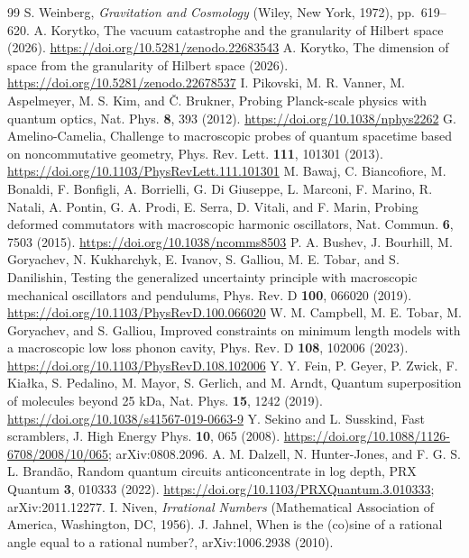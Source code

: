 \documentclass[aps,prd,twocolumn,superscriptaddress,nofootinbib]{revtex4-2}
\begin{document}
\begin{thebibliography}{99}
 S. Weinberg, \emph{Gravitation and Cosmology} (Wiley, New York, 1972), pp.~619--620.
 A. Korytko, The vacuum catastrophe and the granularity of Hilbert space (2026). \url{https://doi.org/10.5281/zenodo.22683543}
 A. Korytko, The dimension of space from the granularity of Hilbert space (2026). \url{https://doi.org/10.5281/zenodo.22678537}
 I. Pikovski, M. R. Vanner, M. Aspelmeyer, M. S. Kim, and \v{C}. Brukner, Probing Planck-scale physics with quantum optics, Nat. Phys. \textbf{8}, 393 (2012). \url{https://doi.org/10.1038/nphys2262}
 G. Amelino-Camelia, Challenge to macroscopic probes of quantum spacetime based on noncommutative geometry, Phys. Rev. Lett. \textbf{111}, 101301 (2013). \url{https://doi.org/10.1103/PhysRevLett.111.101301}
 M. Bawaj, C. Biancofiore, M. Bonaldi, F. Bonfigli, A. Borrielli, G. Di Giuseppe, L. Marconi, F. Marino, R. Natali, A. Pontin, G. A. Prodi, E. Serra, D. Vitali, and F. Marin, Probing deformed commutators with macroscopic harmonic oscillators, Nat. Commun. \textbf{6}, 7503 (2015). \url{https://doi.org/10.1038/ncomms8503}
 P. A. Bushev, J. Bourhill, M. Goryachev, N. Kukharchyk, E. Ivanov, S. Galliou, M. E. Tobar, and S. Danilishin, Testing the generalized uncertainty principle with macroscopic mechanical oscillators and pendulums, Phys. Rev. D \textbf{100}, 066020 (2019). \url{https://doi.org/10.1103/PhysRevD.100.066020}
 W. M. Campbell, M. E. Tobar, M. Goryachev, and S. Galliou, Improved constraints on minimum length models with a macroscopic low loss phonon cavity, Phys. Rev. D \textbf{108}, 102006 (2023). \url{https://doi.org/10.1103/PhysRevD.108.102006}
 Y. Y. Fein, P. Geyer, P. Zwick, F. Kia\l{}ka, S. Pedalino, M. Mayor, S. Gerlich, and M. Arndt, Quantum superposition of molecules beyond 25 kDa, Nat. Phys. \textbf{15}, 1242 (2019). \url{https://doi.org/10.1038/s41567-019-0663-9}
 Y. Sekino and L. Susskind, Fast scramblers, J. High Energy Phys. \textbf{10}, 065 (2008). \url{https://doi.org/10.1088/1126-6708/2008/10/065}; arXiv:0808.2096.
 A. M. Dalzell, N. Hunter-Jones, and F. G. S. L. Brand\~ao, Random quantum circuits anticoncentrate in log depth, PRX Quantum \textbf{3}, 010333 (2022). \url{https://doi.org/10.1103/PRXQuantum.3.010333}; arXiv:2011.12277.
 I. Niven, \emph{Irrational Numbers} (Mathematical Association of America, Washington, DC, 1956).
 J. Jahnel, When is the (co)sine of a rational angle equal to a rational number?, arXiv:1006.2938 (2010).

\end{thebibliography}
\end{document}
